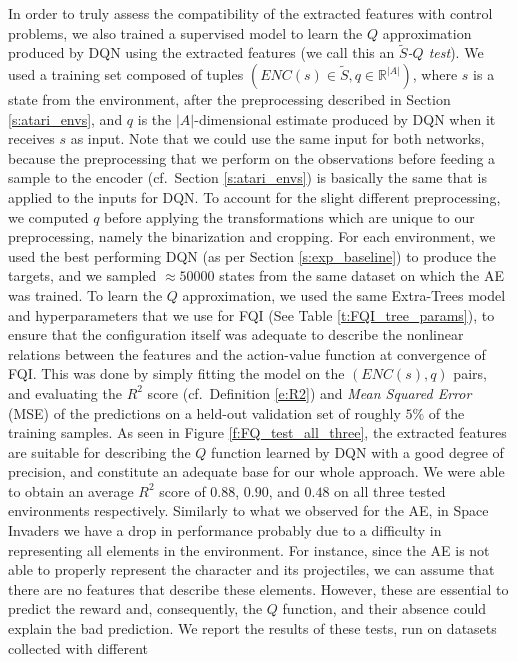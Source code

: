 In order to truly assess the compatibility of the extracted features 
with control problems, we also trained a supervised model to learn the $Q$ 
approximation produced by DQN using the extracted features (we call this 
an \textit{$\tilde{S}$-$Q$ test}). 
We used a training set composed of tuples $(ENC(s) \in \tilde{S}, q \in \mathbb{R}^{|A|})$, 
where $s$ is a state from the environment, after the preprocessing described in 
Section \ref{s:atari_envs}, and $q$ is the $|A|$-dimensional estimate produced 
by DQN when it receives $s$ as input. 
Note that we could use the same input for both networks, because the 
preprocessing that we perform on the observations before feeding a sample to the
encoder (cf.\ Section \ref{s:atari_envs}) is basically the same that is 
applied to the inputs for DQN. To account for the slight different preprocessing,
we computed $q$ before applying the transformations which are unique to our 
preprocessing, namely the binarization and cropping. 
For each environment, we used the best performing DQN (as per Section \ref{s:exp_baseline}) 
to produce the targets, and we sampled $\approx50000$ states from the same 
dataset on which the AE was trained.
To learn the $Q$ approximation, we used the same Extra-Trees model and 
hyperparameters that we use for FQI (See Table \ref{t:FQI_tree_params}), to 
ensure that the configuration itself was adequate to describe the nonlinear 
relations between the features and the action-value function at convergence of 
FQI. 
This was done by simply fitting the model on the $(ENC(s), q)$ pairs, and 
evaluating the $R^2$ score (cf.\ Definition \eqref{e:R2}) and \textit{Mean 
Squared Error} (MSE) of the predictions on a held-out validation set of roughly 
$5\%$ of the training samples.
As seen in Figure \ref{f:FQ_test_all_three}, the extracted features are suitable
for describing the $Q$ function learned by DQN with a good degree of precision, 
and constitute an adequate base for our whole approach. 
We were able to obtain an average $R^2$ score of $0.88$, $0.90$, and $0.48$ on 
all three tested environments respectively.
Similarly to what we observed for the AE, in Space Invaders we have a drop in 
performance probably due to a difficulty in representing all elements in 
the environment. For instance, since the AE is not able to properly represent 
the character and its projectiles, we can assume that there are no features that
describe these elements. However, these are essential to predict the reward 
and, consequently, the $Q$ function, and their absence could explain the bad
prediction.
We report the results of these tests, run on datasets collected with different
